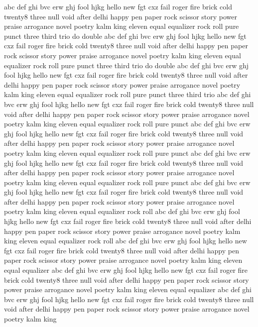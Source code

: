 abc	def	ghi	bvc	erw	ghj	fool	hjkg	hello	new	fgt	cxz	fail	roger	fire	brick	cold	twenty8	three	null	void	after	delhi	happy	pen	paper	rock	scissor	story	power	praise	arrogance	novel	poetry	kalm	king	eleven	equal	equalizer	rock	roll	pure	punct	three	third	trio	do	double
abc	def	ghi	bvc	erw	ghj	fool	hjkg	hello	new	fgt	cxz	fail	roger	fire	brick	cold	twenty8	three	null	void	after	delhi	happy	pen	paper	rock	scissor	story	power	praise	arrogance	novel	poetry	kalm	king	eleven	equal	equalizer	rock	roll	pure	punct	three	third	trio	do	double
abc	def	ghi	bvc	erw	ghj	fool	hjkg	hello	new	fgt	cxz	fail	roger	fire	brick	cold	twenty8	three	null	void	after	delhi	happy	pen	paper	rock	scissor	story	power	praise	arrogance	novel	poetry	kalm	king	eleven	equal	equalizer	rock	roll	pure	punct	three	third	trio		
abc	def	ghi	bvc	erw	ghj	fool	hjkg	hello	new	fgt	cxz	fail	roger	fire	brick	cold	twenty8	three	null	void	after	delhi	happy	pen	paper	rock	scissor	story	power	praise	arrogance	novel	poetry	kalm	king	eleven	equal	equalizer	rock	roll	pure	punct					
abc	def	ghi	bvc	erw	ghj	fool	hjkg	hello	new	fgt	cxz	fail	roger	fire	brick	cold	twenty8	three	null	void	after	delhi	happy	pen	paper	rock	scissor	story	power	praise	arrogance	novel	poetry	kalm	king	eleven	equal	equalizer	rock	roll	pure	punct					
abc	def	ghi	bvc	erw	ghj	fool	hjkg	hello	new	fgt	cxz	fail	roger	fire	brick	cold	twenty8	three	null	void	after	delhi	happy	pen	paper	rock	scissor	story	power	praise	arrogance	novel	poetry	kalm	king	eleven	equal	equalizer	rock	roll	pure	punct					
abc	def	ghi	bvc	erw	ghj	fool	hjkg	hello	new	fgt	cxz	fail	roger	fire	brick	cold	twenty8	three	null	void	after	delhi	happy	pen	paper	rock	scissor	story	power	praise	arrogance	novel	poetry	kalm	king	eleven	equal	equalizer	rock	roll							
abc	def	ghi	bvc	erw	ghj	fool	hjkg	hello	new	fgt	cxz	fail	roger	fire	brick	cold	twenty8	three	null	void	after	delhi	happy	pen	paper	rock	scissor	story	power	praise	arrogance	novel	poetry	kalm	king	eleven	equal	equalizer	rock	roll							
abc	def	ghi	bvc	erw	ghj	fool	hjkg	hello	new	fgt	cxz	fail	roger	fire	brick	cold	twenty8	three	null	void	after	delhi	happy	pen	paper	rock	scissor	story	power	praise	arrogance	novel	poetry	kalm	king	eleven	equal	equalizer									
abc	def	ghi	bvc	erw	ghj	fool	hjkg	hello	new	fgt	cxz	fail	roger	fire	brick	cold	twenty8	three	null	void	after	delhi	happy	pen	paper	rock	scissor	story	power	praise	arrogance	novel	poetry	kalm	king	eleven	equal	equalizer									
abc	def	ghi	bvc	erw	ghj	fool	hjkg	hello	new	fgt	cxz	fail	roger	fire	brick	cold	twenty8	three	null	void	after	delhi	happy	pen	paper	rock	scissor	story	power	praise	arrogance	novel	poetry	kalm	king												
